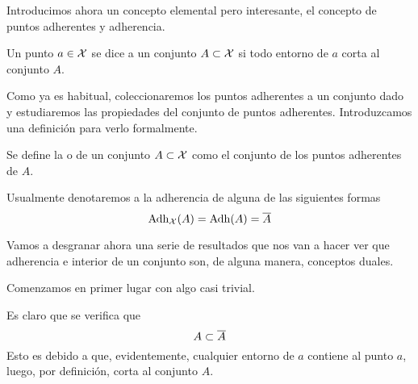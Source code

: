 Introducimos ahora un concepto elemental pero interesante, el concepto de puntos adherentes y adherencia.
\begin{defi}
	\label{etop_defi_puntoAdherente}
	Un punto $a\in\mathcal{X}$ se dice  a un conjunto $A\subset\mathcal{X}$ si todo entorno de $a$ corta al conjunto $A$.
\end{defi}
Como ya es habitual, coleccionaremos los puntos adherentes a un conjunto dado y estudiaremos las propiedades del conjunto de puntos adherentes. Introduzcamos una definición para verlo formalmente.
\begin{defi}[Adherencia]
	\label{etop_defi_adherencia}
	Se define la  o  de un conjunto $A\subset\mathcal{X}$ como el conjunto de los puntos adherentes de $A$.
\end{defi}

Usualmente denotaremos a la adherencia de alguna de las siguientes formas
\begin{equation}
\label{etop_eq_adherencia}
\operatorname{\mathrm{Adh}}_{\mathcal{X}}(A)=\operatorname{\mathrm{Adh}}(A)=\overline{A}
\end{equation}

Vamos a desgranar ahora una serie de resultados que nos van a hacer ver que adherencia e interior de un conjunto son, de alguna manera, conceptos duales.

Comenzamos en primer lugar con algo casi trivial.
\begin{obs}
	\label{etop_obs_adherenciaConjunto}
	Es claro que se verifica que
	\begin{equation}
	\label{etop_eq_adherenciaConjunto}
		A\subset\overline{A}
	\end{equation}
	Esto es debido a que, evidentemente, cualquier entorno de $a$ contiene al punto $a$, luego, por definición, corta al conjunto $A$.
\end{obs}

